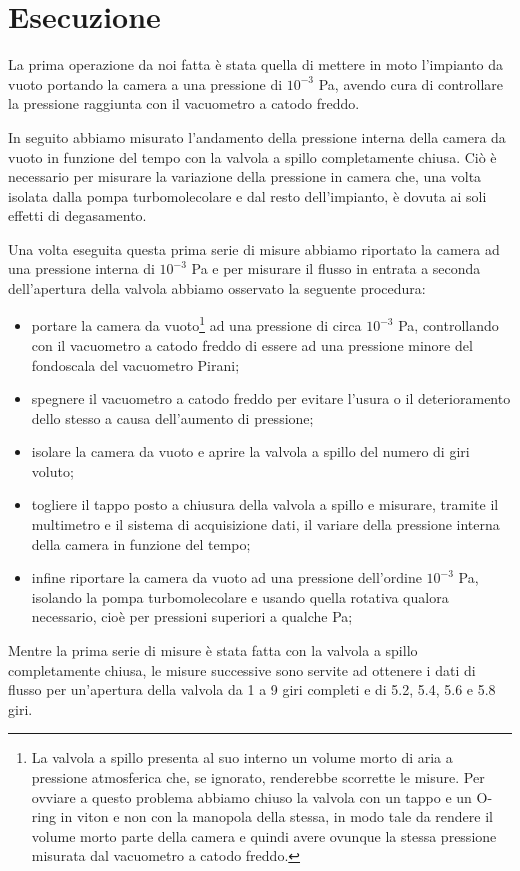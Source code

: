\section{Esecuzione}

La prima operazione da noi fatta è stata quella di mettere in moto l'impianto da vuoto portando la camera a una pressione di $10^{-3}$ \si{\pascal}, avendo cura di controllare la pressione raggiunta con il vacuometro a catodo freddo.

In seguito abbiamo misurato l'andamento della pressione interna della camera da vuoto in funzione del tempo con la valvola a spillo completamente chiusa. Ciò è necessario per misurare la variazione della pressione in camera che, una volta isolata dalla pompa turbomolecolare e dal resto dell'impianto, è dovuta ai soli effetti di degasamento.

Una volta eseguita questa prima serie di misure abbiamo riportato la camera ad una pressione interna di $10^{-3}$ \si{\pascal} e per misurare il flusso in entrata a seconda dell'apertura della valvola abbiamo osservato la seguente procedura:
\begin{itemize}
	\item{portare la camera da vuoto\footnote{La valvola a spillo presenta al suo interno un volume morto di aria a pressione atmosferica che, se ignorato, renderebbe scorrette le misure. Per ovviare a questo problema abbiamo chiuso la valvola con un tappo e un O-ring in viton e non con la manopola della stessa, in modo tale da rendere il volume morto parte della camera e quindi avere ovunque la stessa pressione misurata dal vacuometro a catodo freddo.} ad una pressione di circa $10^{-3}$ \si{\pascal}, controllando con il vacuometro a catodo freddo di essere ad una pressione minore del fondoscala del vacuometro Pirani;}
	\item{spegnere il vacuometro a catodo freddo per evitare l'usura o il deterioramento dello stesso a causa dell'aumento di pressione;}
	\item{isolare la camera da vuoto e aprire la valvola a spillo del numero di giri voluto;}
	\item{togliere il tappo posto a chiusura della valvola a spillo e misurare, tramite il multimetro e il sistema di acquisizione dati, il variare della pressione interna della camera in funzione del tempo;}
	\item{infine riportare la camera da vuoto ad una pressione dell'ordine $10^{-3}$ \si{\pascal}, isolando la pompa turbomolecolare e usando quella rotativa qualora necessario, cioè per pressioni superiori a qualche Pa;}
\end{itemize}
Mentre la prima serie di misure è stata fatta con la valvola a spillo completamente chiusa, le misure successive sono servite ad ottenere i dati di flusso per un'apertura della valvola da 1 a 9 giri completi e di 5.2, 5.4, 5.6 e 5.8 giri.\\

